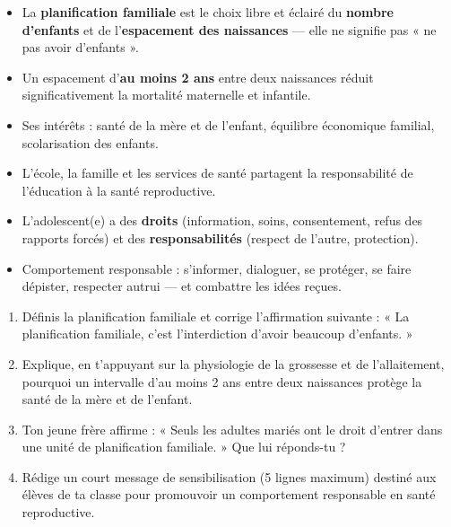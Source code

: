 \documentclass[11pt]{article}
\begin{document}
\begin{aretenir}
\begin{itemize}
\item La \textbf{planification familiale} est le choix libre et éclairé du \textbf{nombre d'enfants} et de l'\textbf{espacement des naissances} — elle ne signifie pas « ne pas avoir d'enfants ».
\item Un espacement d'\textbf{au moins 2 ans} entre deux naissances réduit significativement la mortalité maternelle et infantile.
\item Ses intérêts : santé de la mère et de l'enfant, équilibre économique familial, scolarisation des enfants.
\item L'école, la famille et les services de santé partagent la responsabilité de l'éducation à la santé reproductive.
\item L'adolescent(e) a des \textbf{droits} (information, soins, consentement, refus des rapports forcés) et des \textbf{responsabilités} (respect de l'autre, protection).
\item Comportement responsable : s'informer, dialoguer, se protéger, se faire dépister, respecter autrui — et combattre les idées reçues.
\end{itemize}
\end{aretenir}

\begin{exercice}
\begin{enumerate}
\item Définis la planification familiale et corrige l'affirmation suivante : « La planification familiale, c'est l'interdiction d'avoir beaucoup d'enfants. »
\item Explique, en t'appuyant sur la physiologie de la grossesse et de l'allaitement, pourquoi un intervalle d'au moins 2 ans entre deux naissances protège la santé de la mère et de l'enfant.
\item Ton jeune frère affirme : « Seuls les adultes mariés ont le droit d'entrer dans une unité de planification familiale. » Que lui réponds-tu ?
\item Rédige un court message de sensibilisation (5 lignes maximum) destiné aux élèves de ta classe pour promouvoir un comportement responsable en santé reproductive.
\end{enumerate}
\end{exercice}
\end{document}
